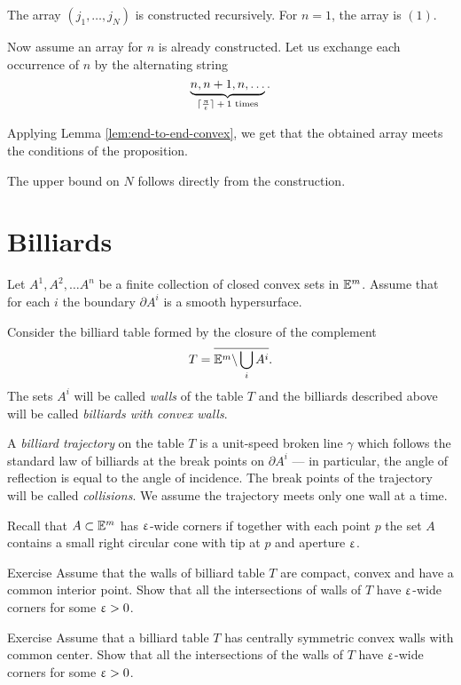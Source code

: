 The array $(j_1,\dots,j_N)$ is constructed recursively.
For $n=1$, the array  is $(1)$.

Now assume an array for $n$ is already constructed.
Let us exchange each occurrence of $n$ by the alternating string 
\[\underbrace{n,n+1,n,\dots}_{\text{$\lceil\tfrac\pi\eps\rceil+1$ times}}.\]

Applying Lemma \ref{lem:end-to-end-convex}, 
we get that the obtained array meets the conditions of the proposition.

The upper bound on $N$ follows directly from the construction.
\qeds



\section{Billiards}

Let $A^1,A^2,\dots A^n$ be a finite collection of closed convex sets in $\mathbb{E}^m$.
Assume that for each $i$
the boundary $\partial A^i$ is a smooth hypersurface.

Consider the billiard table formed by the closure of the complement 
$$T=\overline{\mathbb{E}^m\backslash \bigcup_{i} A^i}.$$
The sets $A^i$ will be called \emph{walls} of the table $T$ 
and the billiards described above will be called \emph{billiards with convex walls}.

A \emph{billiard trajectory} 
on the table $T$ is a unit-speed broken line $\gamma$ 
which follows  the
standard law of billiards 
at the break points on $\partial A^i$ 
--- in particular, the angle of reflection is equal to the angle of incidence.
The break points of the trajectory will be called \emph{collisions}.
We assume the trajectory meets only one wall at a time.

Recall that $A\subset \EE^m$ has $\upvarepsilon$-wide corners
if together with each point $p$
the set $A$ contains a small right circular cone
with tip at $p$ and aperture $\upvarepsilon$.


\begin{thm}{Exercise}\label{ex:compact-walls}
Assume that the walls
of billiard table $T$ 
are compact, convex and have a common  interior point.
Show that all the intersections of  walls of $T$ have $\upvarepsilon$-wide corners for some $\upvarepsilon>0$.
\end{thm}

\begin{thm}{Exercise}\label{ex:centrally-simmetric-walls}
Assume that a billiard table $T$ has
centrally symmetric convex walls with common center.
Show that all the intersections of the walls of $T$  have $\upvarepsilon$-wide corners for some $\upvarepsilon>0$.
\end{thm}

